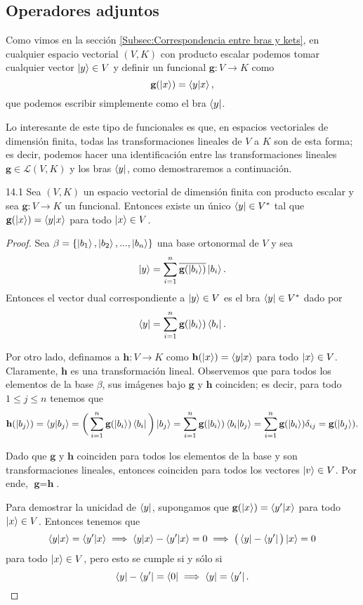 \documentclass[12pt,libertine]{book}
\begin{document}
\subsection*{Operadores adjuntos}

Como vimos en la sección \ref{Subsec:Correspondencia entre bras y kets}, en cualquier espacio vectorial $(V,K)$ con producto escalar podemos tomar cualquier vector $\ket{y}\in V$ y definir un funcional $\textbf{g}:V\to K$ como \[
    \textbf{g}(\ket{x})=\braket{y|x}
,\] que podemos escribir simplemente como el bra $\bra{y}$.

Lo interesante de este tipo de funcionales es que, en espacios vectoriales de dimensión finita, todas las transformaciones lineales de $V$ a $K$ son de esta forma; es decir, podemos hacer una identificación entre las transformaciones lineales $\textbf{g}\in\mathcal{L}(V,K)$ y los bras $\bra{y}$, como demostraremos a continuación.

\begin{Teo} {14.1}
    Sea $(V,K)$ un espacio vectorial de dimensión finita con producto escalar y sea $\textbf{g}:V\to K$ un funcional. Entonces existe un único $\bra{y}\in V^*$ tal que $\textbf{g}(\ket{x})=\braket{y|x}$ para todo $\ket{x}\in V$.

    \begin{proof}
        Sea $\beta=\{\ket{b_1},\ket{b_2},...,\ket{b_n}\}$ una base ortonormal de $V$ y sea \[
            \ket{y}=\sum_{i=1}^n \overline{\textbf{g}(\ket{b_i})}\ket{b_i} 
            .\] Entonces el vector dual correspondiente a $\ket{y}\in V$ es el bra $\bra{y}\in V^*$ dado por \[
            \bra{y}=\sum_{i=1}^n\textbf{g}(\ket{b_i})\bra{b_i}
        .\]  

        Por otro lado, definamos a $\textbf{h}:V\to K$ como $\textbf{h} (\ket{x})=\braket{y|x}$ para todo $\ket{x}\in V$. Claramente, $\textbf{h}$ es una transformación lineal. Observemos que para todos los elementos de la base $\beta$, sus imágenes bajo $\textbf{g}$ y $\textbf{h}$ coinciden; es decir, para todo $1\leq j\leq n$ tenemos que \[
            \textbf{h}(\ket{b_j})=\braket{y|b_j}=\bigg(\sum_{i=1}^n \textbf{g}(\ket{b_i})\bra{b_i}\bigg)\ket{b_j}=\sum_{i=1}^n \textbf{g}(\ket{b_i}) \braket{b_i|b_j}=\sum_{i=1}^n \textbf{g}(\ket{b_i})\delta_{ij}=\textbf{g}(\ket{b_j})
        .\] 

        Dado que $\textbf{g}$ y $\textbf{h}$ coinciden para todos los elementos de la base y son transformaciones lineales, entonces coinciden para todos los vectores $\ket{v}\in V$. Por ende, $\textbf{g}=\textbf{h}$. 

        Para demostrar la unicidad de $\bra{y}$, supongamos que $\textbf{g}(\ket{x})=\braket{y'|x}$ para todo $\ket{x}\in V$. Entonces tenemos que $$\braket{y|x}=\braket{y'|x} \implies \braket{y|x}-\braket{y'|x}=0 \implies \big(\bra{y}-\bra{y'}\big)\ket{x}=0$$ para todo $\ket{x}\in V$, pero esto se cumple si y sólo si $$\bra{y}-\bra{y'}=\bra{0}\implies \bra{y}=\bra{y'}.$$

    \end{proof}
\end{Teo}
\end{document}
